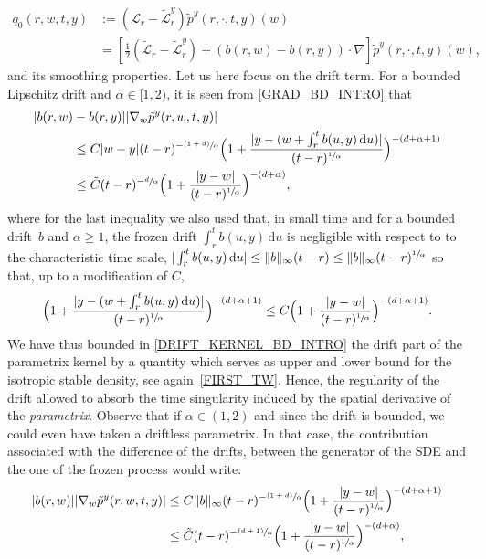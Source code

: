 \documentclass[JEP,XML,SOM,Unicode,published]{cedram}
\newcommand{\psfrac}[2]{\sfrac{(#1)}{#2}}
\theoremstyle{plain}
\theoremstyle{definition}
\newcommand\cL{{\mathcal L}}
\newcommand\1{{\mathbf{1}}}
\newcommand\sL{{\mathscr L}}
\newcommand{\dif}{\,\mathrm{d}}
\begin{document}
{\begin{align*}
q_0(r,w,t,y)&:=(\sL_{r}-\tilde \sL^{y}_r)\tilde p^y (r,\cdot,t,y)(w)\\
&=[\tfrac 12(\tilde \cL_r-\tilde \cL^{y}_{r}) +(b(r,w)-b(r, y))\cdot\nabla] \tilde p^y(r,\cdot,t,y)(w),%
\end{align*}
and its smoothing properties. Let us here focus on the drift term. For a bounded Lipschitz drift and $\alpha\in [1,2)$, it is seen from \eqref{GRAD_BD_INTRO} that
\begin{equation}\label{DRIFT_KERNEL_BD_INTRO}
\begin{aligned}
|b(r,w)&-b(r,y)||\nabla_w \tilde p^y(r,w,t,y)|\\
&\le  C |w-y|(t-r)^{-\psfrac{1+d}\alpha}\Bigl(1+\frac{|y-(w+\int_r^t b(u,y)\dif u)|}{(t-r)^{\sfrac 1\alpha}}\Bigr)^{-(d+\alpha+1)}\\
&\le  \tilde C (t-r)^{-\sfrac{d}\alpha}\Bigl(1+\frac{|y-w|}{(t-r)^{\sfrac 1\alpha}}\Bigr)^{-(d+\alpha)},
\end{aligned}
\end{equation}
where for the last inequality we also used that, in small time and for a bounded drift~$b $ and $\alpha\ge 1 $, the frozen drift $\int_r^t b(u,y)\dif u$ is negligible with respect to to the characteristic time scale, \ie $|\int_r^t b(u,y)\dif u|\le \|b\|_\infty(t-r)\le \|b\|_\infty(t-r)^{\sfrac 1\alpha} $ so that, up to a modification of $C$,
\[
\Bigl(1+\frac{|y-(w+\int_r^t b(u,y)\dif u)|}{(t-r)^{\sfrac 1\alpha}}\Bigr)^{-(d+\alpha+1)}\le C \Bigl(1+\frac{|y-w|}{(t-r)^{\sfrac 1\alpha}}\Bigr)^{-(d+\alpha+1)}.
\]
We have thus bounded in \eqref{DRIFT_KERNEL_BD_INTRO} the drift part of the parametrix kernel by a quantity which serves as upper and lower bound for the isotropic stable density, see again~\eqref{FIRST_TW}. Hence, the regularity of the drift allowed to absorb the time singularity induced by the spatial derivative of the \textit{parametrix}. Observe that if $\alpha\in (1,2) $ and since the drift is bounded, we could even have taken a driftless parametrix. In that case, the contribution associated with the difference of the drifts, between the generator of the SDE and the one of the frozen process would write:
\begin{equation}\label{DRIFT_KERNEL_BD_INTRO_SUB_CRIT}
\begin{aligned}
|b(r,w)||\nabla_w \tilde p^y(r,w,t,y)|
&\le  C \|b\|_\infty(t-r)^{-\psfrac{1+d}\alpha}\Bigl(1+\frac{|y-w|}{(t-r)^{\sfrac 1\alpha}}\Bigr)^{-(d+\alpha+1)}\\
&\le  \tilde C (t-r)^{-\psfrac{d+1}\alpha}\Bigl(1+\frac{|y-w|}{(t-r)^{\sfrac 1\alpha}}\Bigr)^{-(d+\alpha)},

\end{aligned}
\end{equation}}
\end{document}
